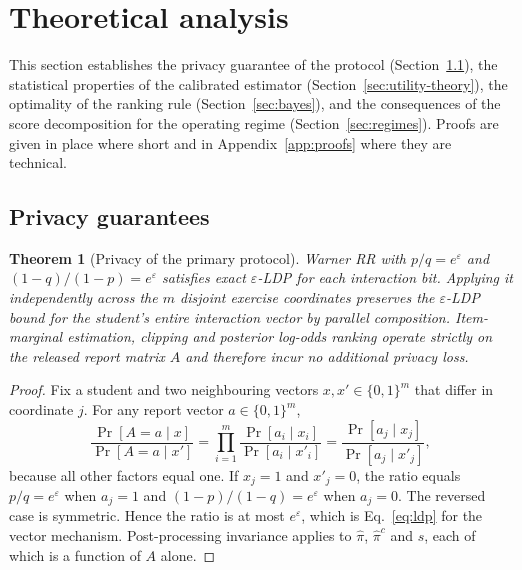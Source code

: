 \documentclass[pdflatex,sn-basic,Numbered]{sn-jnl}
\theoremstyle{plain}
\newtheorem{theorem}{Theorem}
\theoremstyle{remark}
\theoremstyle{definition}
\newcommand{\eps}{\varepsilon}
\newcommand{\Prob}{\Pr}
\begin{document}
\section{Theoretical analysis}\label{sec:theory}

This section establishes the privacy guarantee of the protocol (Section~\ref{sec:privacy-theory}), the statistical properties of the calibrated estimator (Section~\ref{sec:utility-theory}), the optimality of the ranking rule (Section~\ref{sec:bayes}), and the consequences of the score decomposition for the operating regime (Section~\ref{sec:regimes}). Proofs are given in place where short and in Appendix~\ref{app:proofs} where they are technical.

\subsection{Privacy guarantees}\label{sec:privacy-theory}

\begin{theorem}[Privacy of the primary protocol]\label{thm:privacy}
Warner RR with $p/q=e^{\eps}$ and $(1-q)/(1-p)=e^{\eps}$ satisfies exact $\eps$-LDP for each interaction bit. Applying it independently across the $m$ disjoint exercise coordinates preserves the $\eps$-LDP bound for the student's entire interaction vector by parallel composition. Item-marginal estimation, clipping and posterior log-odds ranking operate strictly on the released report matrix $A$ and therefore incur no additional privacy loss.
\end{theorem}

\begin{proof}
Fix a student and two neighbouring vectors $x,x'\in\{0,1\}^{m}$ that differ in coordinate $j$. For any report vector $a\in\{0,1\}^{m}$,
\begin{equation}\label{eq:proof-ratio}
\frac{\Prob[A=a\mid x]}{\Prob[A=a\mid x']}
=\prod_{i=1}^{m}\frac{\Prob[a_i\mid x_i]}{\Prob[a_i\mid x'_i]}
=\frac{\Prob[a_j\mid x_j]}{\Prob[a_j\mid x'_j]},
\end{equation}
because all other factors equal one. If $x_j=1$ and $x'_j=0$, the ratio equals $p/q=e^{\eps}$ when $a_j=1$ and $(1-p)/(1-q)=e^{\eps}$ when $a_j=0$. The reversed case is symmetric. Hence the ratio is at most $e^{\eps}$, which is Eq.~\eqref{eq:ldp} for the vector mechanism. Post-processing invariance \cite{dwork2014algorithmic} applies to $\hat\pi$, $\hat\pi^{c}$ and $s$, each of which is a function of $A$ alone.
\end{proof}
\end{document}
